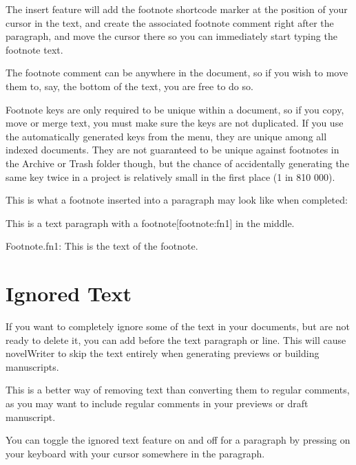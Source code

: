 \documentclass[a4paper,11pt,english]{sphinxmanual}
\begin{document}
\sphinxAtStartPar
The insert feature will add the footnote shortcode marker at the position of your cursor in the
text, and create the associated footnote comment right after the paragraph, and move the cursor
there so you can immediately start typing the footnote text.

\sphinxAtStartPar
The footnote comment can be anywhere in the document, so if you wish to move them to, say, the
bottom of the text, you are free to do so.

\sphinxAtStartPar
Footnote keys are only required to be unique within a document, so if you copy, move or merge text,
you must make sure the keys are not duplicated. If you use the automatically generated keys from
the  menu, they are unique among all indexed documents. They are not guaranteed to be
unique against footnotes in the Archive or Trash folder though, but the chance of accidentally
generating the same key twice in a project is relatively small in the first place (1 in 810 000).

\sphinxAtStartPar
This is what a footnote inserted into a paragraph may look like when completed:

\begin{sphinxVerbatim}[commandchars=\\\{\}]
This is a text paragraph with a footnote[footnote:fn1] in the middle.

\PYGZpc{}Footnote.fn1: This is the text of the footnote.
\end{sphinxVerbatim}

\sphinxAtStartPar
{}


\section{Ignored Text}
\label{\detokenize{usage_format:ignored-text}}\label{\detokenize{usage_format:a-fmt-ignore}}
\sphinxAtStartPar
If you want to completely ignore some of the text in your documents, but are not ready to delete
it, you can add \sphinxcode{\sphinxupquote{\%\textasciitilde{}}} before the text paragraph or line. This will cause novelWriter to skip the
text entirely when generating previews or building manuscripts.

\sphinxAtStartPar
This is a better way of removing text than converting them to regular comments, as you may want to
include regular comments in your previews or draft manuscript.

\sphinxAtStartPar
You can toggle the ignored text feature on and off for a paragraph by pressing 
on your keyboard with your cursor somewhere in the paragraph.
\end{document}
